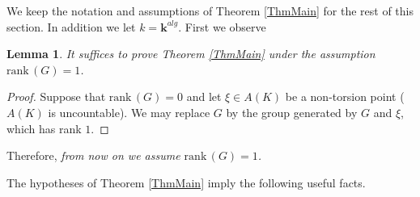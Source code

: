 \documentclass[11pt]{amsart}
\newtheorem{lemma}[theorem]{Lemma}
\theoremstyle{remark}
\numberwithin{equation}{section}
\newcommand{\kk}{\mathbf{k}}
\newcommand{\rk}{\mathrm{rank}\,}
\begin{document}
We keep the notation and assumptions of Theorem \ref{ThmMain} for the rest of this section. In addition we let $k=\kk^{alg}$. First we observe 

\begin{lemma}\label{LemmaRk1} It suffices to prove Theorem \ref{ThmMain} under the assumption $\rk(G)=1$.
\end{lemma}
\begin{proof} Suppose that $\rk(G)=0$ and let $\xi\in A(K)$ be a non-torsion point ($A(K)$ is uncountable). We may replace $G$ by the group generated by $G$ and $\xi$, which has rank $1$.
\end{proof}

Therefore, \emph{from now on we assume $\rk(G)=1$.}




The hypotheses of Theorem \ref{ThmMain} imply the following useful facts.
\end{document}
